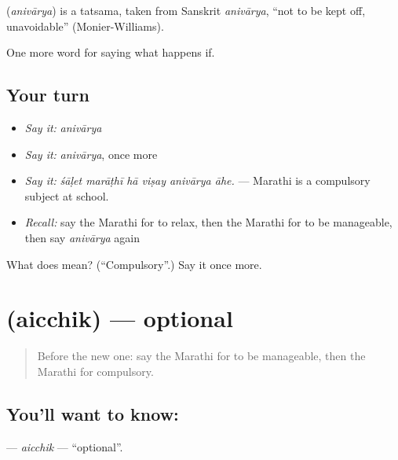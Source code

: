 \begin{cousinweb}
\textbf{} (\emph{anivārya}) is a tatsama, taken from Sanskrit \emph{anivārya}, \textquotedblleft{}not to be kept off, unavoidable\textquotedblright{} (Monier-Williams).
\end{cousinweb}

\begin{grammarlens}[title={What you've built}]
One more word for saying what happens if.
\end{grammarlens}

\subsection*{Your turn}
\begin{itemize}
\raggedright
  \item \emph{Say it:} \emph{anivārya}
  \item \emph{Say it:} \emph{anivārya}, once more
  \item \emph{Say it:} \emph{śāḷet marāṭhī hā viṣay anivārya āhe.} — Marathi is a compulsory subject at school.
  \item \emph{Recall:} say the Marathi for to relax, then the Marathi for to be manageable, then say \emph{anivārya} again
\end{itemize}

\begin{tcolorbox}[breakable,colback=teal!4,colframe=teal!35!black,title={Before you move on}]
What does  mean? (\textquotedblleft{}Compulsory\textquotedblright{}.) Say it once more.
\end{tcolorbox}
\section[\texorpdfstring{\mr{ऐच्छिक} (aicchik)}{ऐच्छिक (aicchik)}]{ (aicchik) — optional}

\label{lesson:MR-C380-aicchik}



\begin{quote}
Before the new one: say the Marathi for to be manageable, then the Marathi for compulsory.
\end{quote}

\subsection*{You'll want to know: }
\textbf{} — \emph{aicchik} — \textquotedblleft{}optional\textquotedblright{}.

